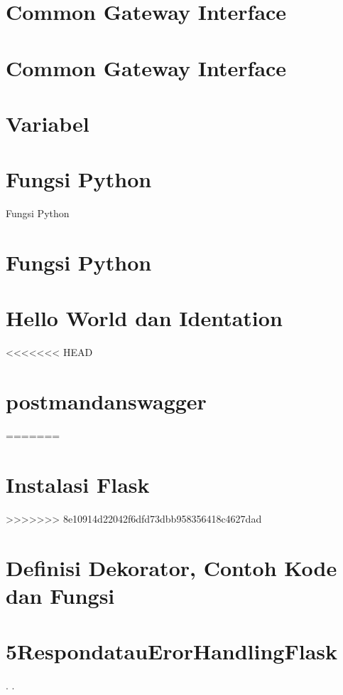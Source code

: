 \documentclass{wileySix}
\begin{document}
\chapter[Pemanggilan Modul]
{Common Gateway Interface}


\chapter[Instalasi PIP]
{Common Gateway Interface}


\chapter[Variabel]
{Variabel}


\chapter{Fungsi Python}
{Fungsi Python}


\chapter[Fungsi Python]
{Fungsi Python}


\chapter[Hello World Python dan Identation]
{Hello World dan Identation}


<<<<<<< HEAD
\chapter[3postmandanswagger]
{postmandanswagger}


=======
\chapter[Instalasi Flask]
{Instalasi Flask}

>>>>>>> 8e10914d22042f6dfd73dbb958356418c4627dad

\chapter[Definisi Dekorator, Contoh Kode dan Fungsi]
{Definisi Dekorator, Contoh Kode dan Fungsi}


\chapter[5RespondatauErorHandlingFlask]
{5RespondatauErorHandlingFlask}






.
.

\printindex
\end{document}
